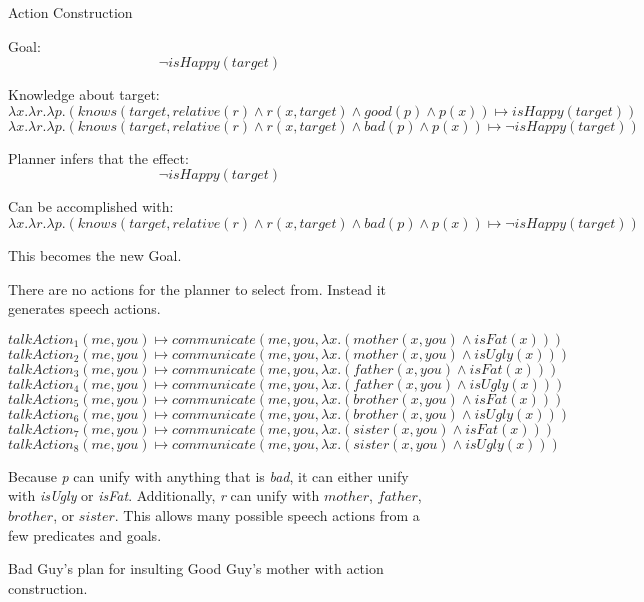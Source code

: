 \documentclass{article}
\begin{document}


  
\begin{figure}[htp!]
\begin{center}\large{Action Construction}\end{center}

  Goal:
  $$
  \neg isHappy(target)
  $$

  Knowledge about target:
  \[
  \lambda x.\lambda r.\lambda p.(knows(target, relative(r) \wedge r(x,target) \wedge good(p) \wedge p(x)) \mapsto isHappy(target))
  \]
  \[
  \lambda x.\lambda r.\lambda p.(knows(target, relative(r) \wedge r(x,target) \wedge bad(p) \wedge p(x)) \mapsto \neg isHappy(target))
  \]
  
  Planner infers that the effect:
  \[
  \neg isHappy(target)
  \]

  Can be accomplished with:
  \[
  \lambda x.\lambda r.\lambda p.(knows(target, relative(r) \wedge r(x,target) \wedge bad(p) \wedge p(x)) \mapsto \neg isHappy(target))
  \]

  This becomes the new Goal.

  There are no actions for the planner to select from.  Instead it generates speech
  actions.

  \[
  talkAction_1(me, you) \mapsto communicate(me, you, \lambda x.(mother(x, you) \wedge isFat(x)))
  \]
  \[
  talkAction_2(me, you) \mapsto communicate(me, you, \lambda x.(mother(x, you) \wedge isUgly(x)))
  \]
  \[
  talkAction_3(me, you) \mapsto communicate(me, you, \lambda x.(father(x, you) \wedge isFat(x)))
  \]
  \[
  talkAction_4(me, you) \mapsto communicate(me, you, \lambda x.(father(x, you) \wedge isUgly(x)))
  \]
  \[
  talkAction_5(me, you) \mapsto communicate(me, you, \lambda x.(brother(x, you) \wedge isFat(x)))
  \]
  \[
  talkAction_6(me, you) \mapsto communicate(me, you, \lambda x.(brother(x, you) \wedge isUgly(x)))
  \]
  \[
  talkAction_7(me, you) \mapsto communicate(me, you, \lambda x.(sister(x, you) \wedge isFat(x)))
  \]
  \[
  talkAction_8(me, you) \mapsto communicate(me, you, \lambda x.(sister(x, you) \wedge isUgly(x)))
  \]

  Because \emph{p} can unify with anything that is \emph{bad}, it can either unify with
  \emph{isUgly} or \emph{isFat}.  Additionally, \emph{r} can unify with $mother$, $father$, $brother$, or $sister$.  This allows many possible speech actions from a few predicates
  and goals.

  \caption{Bad Guy's plan for insulting Good Guy's mother with action construction.}
  \label{plan_construction}
\end{figure}
\end{document}
